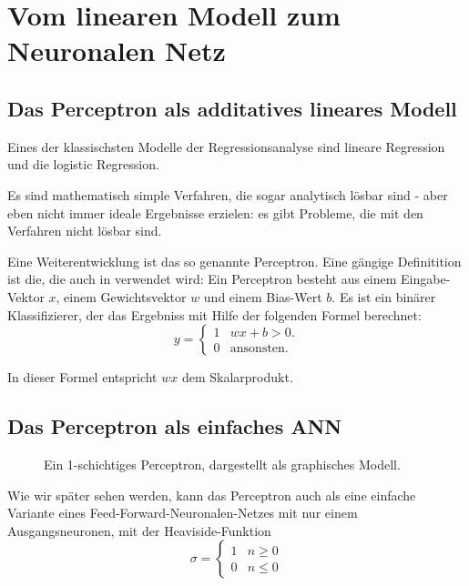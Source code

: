 ﻿\section{Vom linearen Modell zum Neuronalen Netz}

\subsection{Das Perceptron als additatives lineares Modell}
Eines der klassischsten Modelle der Regressionsanalyse sind lineare Regression und die logistic Regression. 

Es sind mathematisch simple Verfahren, die sogar analytisch lösbar sind - aber eben nicht immer ideale Ergebnisse erzielen: es gibt Probleme, die mit den Verfahren nicht lösbar sind. 

Eine Weiterentwicklung ist das so genannte Perceptron.
Eine gängige Definitition ist die, die auch in \cite{bishop1995neural} verwendet wird: 
Ein Perceptron besteht aus einem Eingabe-Vektor $x$, einem Gewichtsvektor $w$ und einem Bias-Wert $b$. Es ist ein binärer Klassifizierer, der das Ergebniss mit Hilfe der folgenden Formel berechnet:
\begin{equation}
\label{eq:perceptron}
    y = \begin{cases}
               1               & w x + b > 0.\\
               0               & \text{ansonsten}. %
           \end{cases} 
\end{equation}

In dieser Formel entspricht $wx$ dem Skalarprodukt.

\subsection{Das Perceptron als einfaches ANN}
\begin{figure}[ht!]
\label{fig:SLP}
  \centering
    
  \caption{Ein 1-schichtiges Perceptron, dargestellt als graphisches Modell.}
\end{figure}

Wie wir später sehen werden, kann das Perceptron auch als eine einfache Variante eines Feed-Forward-Neuronalen-Netzes mit nur einem Ausgangsneuronen, mit der Heaviside-Funktion
\begin{equation}
    \sigma = \begin{cases}
               1               & n \geq 0\\
               0               & n \leq 0
           \end{cases}
\end{equation}

